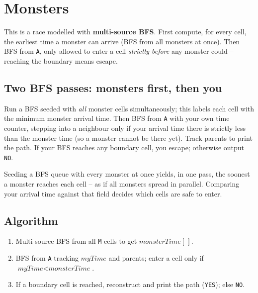 \section{Monsters}
\label{sec:cses-monsters}


\begin{patternbox}
This is a race modelled with \textbf{multi-source BFS}. First compute, for
every cell, the earliest time a monster can arrive (BFS from all monsters
at once). Then BFS from \texttt{A}, only allowed to enter a cell
\emph{strictly before} any monster could -- reaching the boundary means
escape.
\end{patternbox}

\subsection*{Two BFS passes: monsters first, then you}

Run a BFS seeded with \emph{all} monster cells simultaneously; this labels
each cell with the minimum monster arrival time. Then BFS from \texttt{A}
with your own time counter, stepping into a neighbour only if your arrival
time there is strictly less than the monster time (so a monster cannot be
there yet). Track parents to print the path. If your BFS reaches any
boundary cell, you escape; otherwise output \texttt{NO}.

\begin{ideabox}
Seeding a BFS queue with every monster at once yields, in one pass, the
soonest a monster reaches each cell -- as if all monsters spread in
parallel. Comparing your arrival time against that field decides which
cells are safe to enter.
\end{ideabox}

\subsection*{Algorithm}

\begin{enumerate}
  \item Multi-source BFS from all \texttt{M} cells to get
        $\textit{monsterTime}[\,]$.
  \item BFS from \texttt{A} tracking $\textit{myTime}$ and parents;
        enter a cell only if $\textit{myTime}<\textit{monsterTime}$.
  \item If a boundary cell is reached, reconstruct and print the path
        (\texttt{YES}); else \texttt{NO}.
\end{enumerate}

